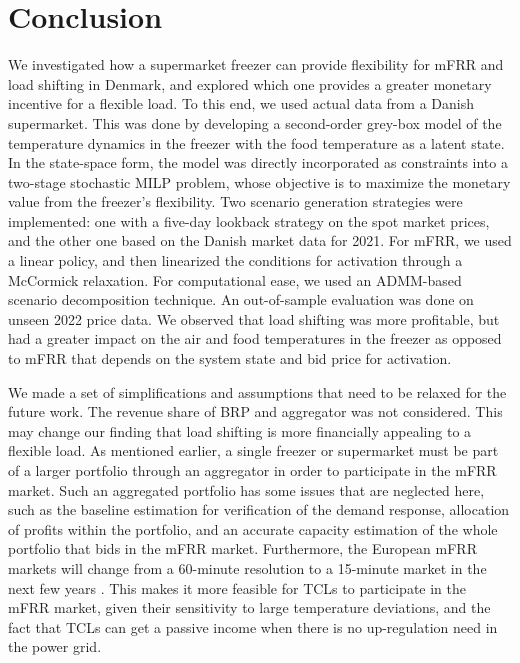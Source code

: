 \section{Conclusion}\label{sec:conclusion}

We investigated how a supermarket freezer can provide flexibility for mFRR and load shifting in Denmark, and explored which one provides a greater monetary incentive for a flexible load. To this end, we used actual data  from a Danish supermarket. This was done by developing a second-order grey-box model of the temperature dynamics in the freezer with the food temperature as a latent state. In the state-space form, the model was directly incorporated as constraints into a two-stage stochastic MILP problem, whose objective is to maximize the monetary value from the freezer's flexibility. Two scenario generation strategies were implemented: one with a five-day lookback strategy on the spot market prices, and the other one  based on the Danish market data for 2021. For mFRR, we used a linear policy, and then linearized the conditions for activation through  a McCormick relaxation. For computational ease, we used an ADMM-based scenario decomposition technique.  An out-of-sample evaluation was done on unseen 2022 price data. We observed that load shifting was more profitable, but had a greater impact on the air and food temperatures in the freezer as opposed to mFRR that depends on the system state and bid price for activation.

We made a set of simplifications and assumptions that need to be relaxed for the future work. The revenue share of BRP and aggregator was not considered. This may change our finding that load shifting is more financially appealing to a flexible load. As mentioned earlier, a single freezer or supermarket must be part of a larger portfolio through an aggregator in order to participate in the mFRR market. Such an aggregated portfolio has some issues that are neglected here, such as the baseline estimation for verification of the demand response, allocation of profits within the portfolio, and an accurate capacity estimation of the whole portfolio that bids in the mFRR market. Furthermore, the European mFRR markets will change from a 60-minute resolution to a 15-minute market in the next few years \cite{MARI}. This makes it more feasible for TCLs to participate in the mFRR market, given their sensitivity to large temperature deviations, and the fact that TCLs can get a passive income when there is no up-regulation need in the power grid.